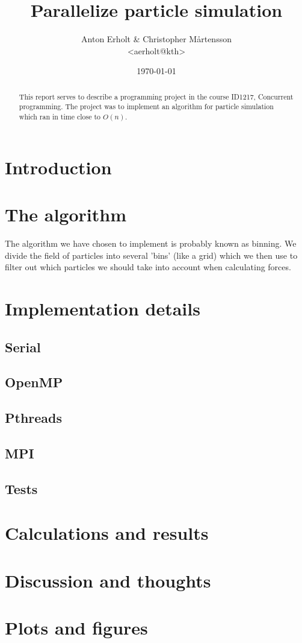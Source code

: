 \documentclass[11pt]{article}
\author{Anton Erholt \& Christopher Mårtensson \\ <aerholt@kth>}
\date{\today}
\title{Parallelize particle simulation}
\begin{document}
\maketitle
\newpage
\begin{abstract}

This report serves to describe a programming project in the course ID1217,
Concurrent programming. The project was to implement an algorithm for particle
simulation which ran in time close to $O(n)$.

\end{abstract}
\newpage


\section*{Introduction}
\label{sec-1}

\section*{The algorithm}
\label{sec-2}

The algorithm we have chosen to implement is probably known as binning. We
divide the field of particles into several 'bins' (like a grid) which we then
use to filter out which particles we should take into account when calculating
forces.

\section*{Implementation details}
\label{sec-3}

\subsection*{Serial}
\label{sec-3-1}

\subsection*{OpenMP}
\label{sec-3-2}

\subsection*{Pthreads}
\label{sec-3-3}

\subsection*{MPI}
\label{sec-3-4}

\subsection*{Tests}
\label{sec-3-5}

\section*{Calculations and results}
\label{sec-4}

\section*{Discussion and thoughts}
\label{sec-5}

\section*{Plots and figures}
\label{sec-6}
\end{document}
